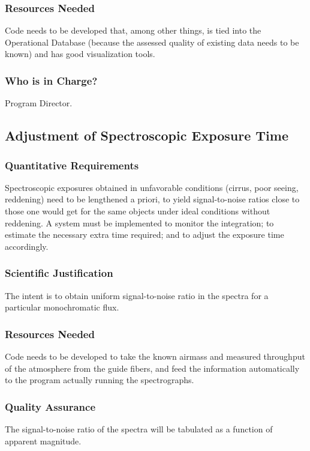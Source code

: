\subsubsection{Resources Needed}

Code needs to be developed that, among other things, is tied into the
Operational Database
(because the assessed quality of existing data needs to be known) and has 
good visualization tools. 

\subsubsection{Who is in Charge?}

Program Director. 


\subsection{Adjustment of Spectroscopic Exposure Time}

\subsubsection{Quantitative Requirements}

Spectroscopic exposures obtained in unfavorable conditions (cirrus,
poor seeing, reddening) need to be lengthened a priori, to yield
signal-to-noise ratios close to those one would get for the same
objects under ideal conditions without reddening.  A system must be
implemented to monitor the integration; to estimate the necessary
extra time required; and to adjust the exposure time accordingly.

\subsubsection{Scientific Justification}

The intent is to obtain uniform signal-to-noise ratio in the spectra for a 
particular monochromatic flux. 

\subsubsection{Resources Needed}
Code needs to be developed to take the known airmass and measured
throughput of the atmosphere from the guide fibers, and feed the
information automatically to the program actually running the
spectrographs. 

\subsubsection{Quality Assurance}
The signal-to-noise ratio of the spectra will be tabulated as a
function of apparent magnitude. 

